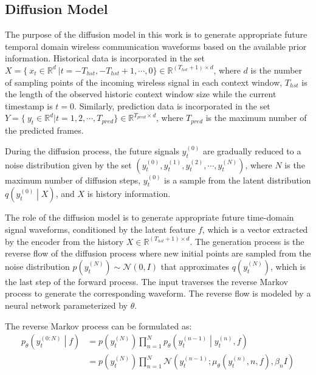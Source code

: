 \documentclass[lettersize,journal]{IEEEtran}
\begin{document}
\subsection{Diffusion Model}
The purpose of the diffusion model in this work is to generate appropriate future temporal domain wireless communication waveforms based on the available prior information. Historical data is incorporated in the set $X=\{\ x_t\in\mathbb{R}^d\ |t=-T_{hst},-T_{hst}+1,\cdots,0\}\in\mathbb{R}^{\left(T_{hst}+1\right)\times d}$, where $d$ is the number of sampling points of the incoming wireless signal in each context window, $T_{hst}$ is the length of the observed historic context window size while the current timestamp is $t=0$. Similarly, prediction data is incorporated in the set $Y=\{\ y_t\in\mathbb{R}^d|t=1,2,\cdots,T_{pred}\}\in\mathbb{R}^{T_{pred}\times d}$, where $T_{pred}$ is the maximum number of the predicted frames.

During the diffusion process, the future signals $y_t^{\left(0\right)}$ are gradually reduced to a noise distribution given by the set $\left(y_t^{\left(0\right)},y_t^{\left(1\right)},y_t^{\left(2\right)},\cdots,y_t^{\left(N\right)}\right)$, where $N$ is the maximum number of diffusion steps, $y_t^{\left(0\right)}$ is a sample from the latent distribution $q\left(y_t^{\left(0\right)}\middle| X\right)$, and $X$ is history information.

The role of the diffusion model is to generate appropriate future time-domain signal waveforms, conditioned by the latent feature $f$, which is a vector extracted by the encoder from the history $X\in \mathbb{R}^{\left(T_{hst}+1\right)\times d}$. The generation process is the reverse flow of the diffusion process where new initial points are sampled from the noise distribution $p\left(y_t^{\left(N\right)}\right) \sim \mathcal{N}\left(0,I\right)$ that approximates $q\left(y_t^{\left(N\right)}\right)$, which is the last step of the forward process. The input traverses the reverse Markov process to generate the corresponding waveform. The reverse flow is modeled by a neural network parameterized by $\theta$. 

The reverse Markov process can be formulated as:
\begin{equation}
    \begin{aligned}
        p_\theta\left(y_t^{\left(0:N\right)}\middle| f\right)&=p\left(y_t^{\left(N\right)}\right)\prod_{n=1}^{N}{p_\theta\left(y_t^{\left(n-1\right)}\middle| y_t^{\left(n\right)},f\right)} \\
        &=p\left(y_t^{\left(N\right)}\right)\prod_{n=1}^{N}\mathcal{N}\left(y_t^{\left(n-1\right)};\mu_\theta\left(y_t^{\left(n\right)},n,f\right),\beta_nI\right)
    \end{aligned}
\end{equation}
\end{document}
